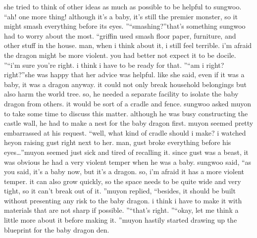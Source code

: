 she tried to think of other ideas as much as possible to be helpful to sungwoo.
“ah! one more thing! although it’s a baby, it’s still the premier monster, so it might smash everything before its eyes.
”“smashing?”that’s something sungwoo had to worry about the most.
“griffin used smash floor paper, furniture, and other stuff in the house.
 man, when i think about it, i still feel terrible.
 i’m afraid the dragon might be more violent.
 you had better not expect it to be docile.
”“i’m sure you’re right.
 i think i have to be ready for that.
”“am i right? right?”she was happy that her advice was helpful.
 like she said, even if it was a baby, it was a dragon anyway.
 it could not only break household belongings but also harm the world tree.
 so, he needed a separate facility to isolate the baby dragon from others.
 it would be sort of a cradle and fence.
sungwoo asked muyon to take some time to discuss this matter.
 although he was busy constructing the castle wall, he had to make a nest for the baby dragon first.
muyon seemed pretty embarrassed at his request.
“well, what kind of cradle should i make? i watched heyon raising gust right next to her.
 man, gust broke everything before his eyes…”muyon seemed just sick and tired of recalling it.
 since gust was a beast, it was obvious he had a very violent temper when he was a baby.
sungwoo said, “as you said, it’s a baby now, but it’s a dragon.
 so, i’m afraid it has a more violent temper.
 it can also grow quickly, so the space needs to be quite wide and very tight, so it can’t break out of it.
”muyon replied, “besides, it should be built without presenting any risk to the baby dragon.
 i think i have to make it with materials that are not sharp if possible.
”“that’s right.
”“okay, let me think a little more about it before making it.
”muyon hastily started drawing up the blueprint for the baby dragon den.


 